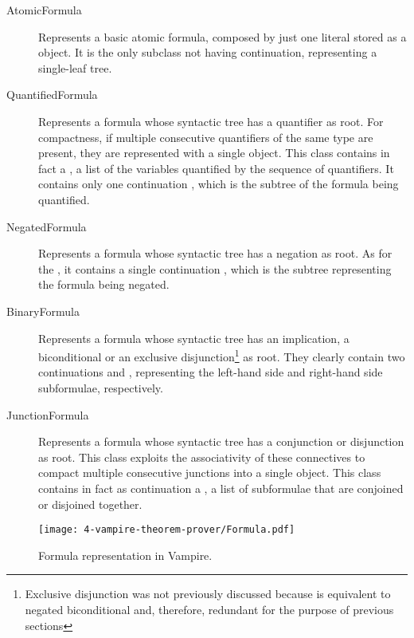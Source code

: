 \begin{description}
  \item[AtomicFormula]  Represents a basic atomic formula, composed by just one literal stored as a  object. It is the only subclass not having continuation, representing a single-leaf tree.
  \item[QuantifiedFormula]  Represents a formula whose syntactic tree has a quantifier as root.
                            For compactness, if multiple consecutive quantifiers of the same type are present, they are represented with a single  object.
                            This class contains in fact a , a list of the variables quantified by the sequence of quantifiers.
                            It contains only one continuation , which is the subtree of the formula being quantified.
  \item[NegatedFormula] Represents a formula whose syntactic tree has a negation as root.
                        As for the , it contains a single continuation , which is the subtree representing the formula being negated.
  \item[BinaryFormula]  Represents a formula whose syntactic tree has an implication, a biconditional or an exclusive disjunction\footnote{
                        Exclusive disjunction was not previously discussed because is equivalent to negated biconditional and, therefore, redundant for the purpose of previous sections} as root.
                        They clearly contain two continuations  and , representing the left-hand side and right-hand side subformulae, respectively.
  \item[JunctionFormula]  Represents a formula whose syntactic tree has a conjunction or disjunction as root.
                          This class exploits the associativity of these connectives to compact multiple consecutive junctions into a single object.
                          This class contains in fact as continuation a , a list of subformulae that are conjoined or disjoined together.
\end{description}

\begin{figure}[H]
  \centering
  \texttt{[image: 4-vampire-theorem-prover/Formula.pdf]}
  \caption{Formula representation in Vampire.}\label{fig:formula-representation}
\end{figure}

